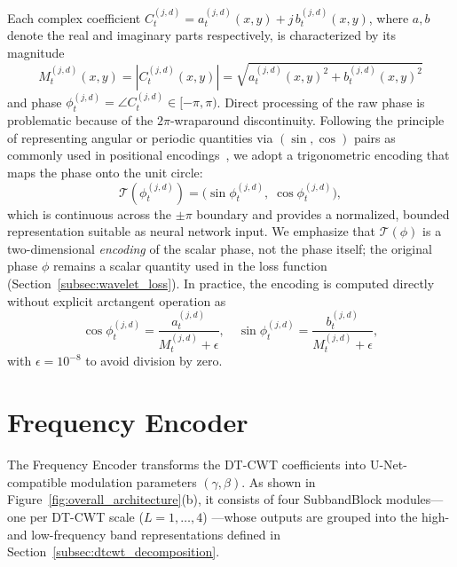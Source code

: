Each complex coefficient $C^{(j,d)}_t = a^{(j,d)}_t(x,y) + 
j\,b^{(j,d)}_t(x,y)$, where $a, b$ denote the real and imaginary 
parts respectively, is characterized by its magnitude
\begin{equation}
    M^{(j,d)}_t(x,y) = |C^{(j,d)}_t(x,y)| = 
    \sqrt{a^{(j,d)}_t(x,y)^2 + b^{(j,d)}_t(x,y)^2}
    \label{eq:magnitude}
\end{equation}
and phase $\phi^{(j,d)}_t = \angle C^{(j,d)}_t \in [-\pi, \pi)$. 
Direct processing of the raw phase is problematic because of the 
$2\pi$-wraparound discontinuity. Following the principle of 
representing angular or periodic quantities via $(\sin, \cos)$ 
pairs as commonly used in positional 
encodings~\cite{vaswani2017attention,mildenhall2020nerf}, we adopt 
a trigonometric encoding that maps the phase onto the unit circle:
\begin{equation}
    \mathcal{T}(\phi^{(j,d)}_t) = 
    \big( \sin \phi^{(j,d)}_t,\; \cos \phi^{(j,d)}_t \big),
    \label{eq:trig_encoding}
\end{equation}
which is continuous across the $\pm \pi$ boundary and provides a 
normalized, bounded representation suitable as neural network 
input. We emphasize that $\mathcal{T}(\phi)$ is a 
two-dimensional \emph{encoding} of the scalar phase, not the phase 
itself; the original phase $\phi$ remains a scalar quantity used 
in the loss function (Section~\ref{subsec:wavelet_loss}). In 
practice, the encoding is computed directly without explicit 
arctangent operation as
\begin{equation}
    \cos\phi^{(j,d)}_t = \frac{a^{(j,d)}_t}
    {M^{(j,d)}_t + \epsilon}, \quad
    \sin\phi^{(j,d)}_t = \frac{b^{(j,d)}_t}
    {M^{(j,d)}_t + \epsilon},
    \label{eq:trig_encoding_compute}
\end{equation}
with $\epsilon = 10^{-8}$ to avoid division by zero.

\section{Frequency Encoder}
\label{sec:freq_encoder}

The Frequency Encoder transforms the DT-CWT coefficients into 
U-Net-compatible modulation parameters $(\gamma, \beta)$. As shown 
in Figure~\ref{fig:overall_architecture}(b), it consists of four 
SubbandBlock modules---one per DT-CWT scale ($L{=}1, \ldots, 4$)
---whose outputs are grouped into the high- and low-frequency 
band representations defined in Section~\ref{subsec:dtcwt_decomposition}.

